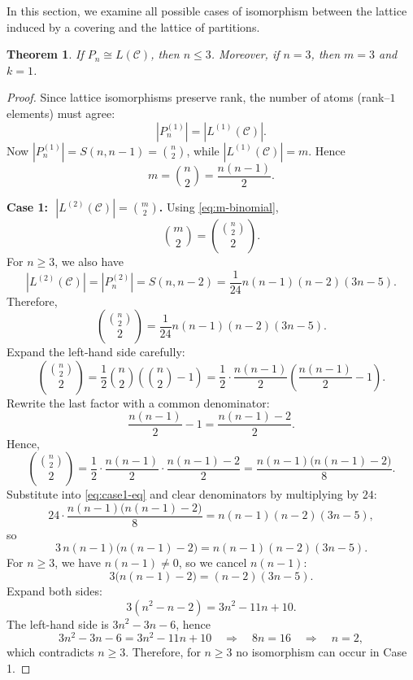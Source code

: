 \documentclass{article}
\newtheorem{theorem}{Theorem}[section]
\begin{document}
In this section, we examine all possible cases of isomorphism between the lattice induced by a covering and the lattice of partitions.

\begin{theorem}\label{thm:Pn-necessary}
If \(P_n \cong L(\mathcal C)\), then \(n\le 3\).
Moreover, if \(n=3\), then \(m=3\) and \(k=1\).
\end{theorem}

\begin{proof}
Since lattice isomorphisms preserve rank, the number of atoms (rank--\(1\) elements) must agree:
\[
|P_n^{(1)}| = |L^{(1)}(\mathcal C)|.
\]
Now \(|P_n^{(1)}| = S(n,n-1)=\binom{n}{2}\), while \(|L^{(1)}(\mathcal C)|=m\). Hence
\begin{equation}\label{eq:m-binomial}
m=\binom{n}{2}=\frac{n(n-1)}{2}.
\end{equation}

\medskip
\noindent\textbf{Case 1: \(\;|L^{(2)}(\mathcal C)|=\binom{m}{2}\).}
Using \eqref{eq:m-binomial},
\[
\binom{m}{2}=\binom{\binom{n}{2}}{2}.
\]
For \(n\ge 3\), we also have
\[
|L^{(2)}(\mathcal C)|=|P_n^{(2)}|=S(n,n-2)=\frac{1}{24}n(n-1)(n-2)(3n-5).
\]
Therefore,
\begin{equation}\label{eq:case1-eq}
\binom{\binom{n}{2}}{2}=\frac{1}{24}n(n-1)(n-2)(3n-5).
\end{equation}
Expand the left-hand side carefully:
\[
\binom{\binom{n}{2}}{2}
=\frac{1}{2}\binom{n}{2}\!\left(\binom{n}{2}-1\right)
=\frac{1}{2}\cdot \frac{n(n-1)}{2}\left(\frac{n(n-1)}{2}-1\right).
\]
Rewrite the last factor with a common denominator:
\[
\frac{n(n-1)}{2}-1=\frac{n(n-1)-2}{2}.
\]
Hence,
\[
\binom{\binom{n}{2}}{2}
=\frac{1}{2}\cdot \frac{n(n-1)}{2}\cdot \frac{n(n-1)-2}{2}
=\frac{n(n-1)\bigl(n(n-1)-2\bigr)}{8}.
\]
Substitute into \eqref{eq:case1-eq} and clear denominators by multiplying by \(24\):
\[
24\cdot \frac{n(n-1)\bigl(n(n-1)-2\bigr)}{8}
= n(n-1)(n-2)(3n-5),
\]
so
\[
3\,n(n-1)\bigl(n(n-1)-2\bigr)=n(n-1)(n-2)(3n-5).
\]
For \(n\ge 3\), we have \(n(n-1)\neq 0\), so we cancel \(n(n-1)\):
\[
3\bigl(n(n-1)-2\bigr)=(n-2)(3n-5).
\]
Expand both sides:
\[
3(n^2-n-2) = 3n^2-11n+10.
\]
The left-hand side is \(3n^2-3n-6\), hence
\[
3n^2-3n-6 = 3n^2-11n+10
\quad\Longrightarrow\quad
8n=16
\quad\Longrightarrow\quad
n=2,
\]
which contradicts \(n\ge 3\). Therefore, for \(n\ge 3\) no isomorphism can occur in Case 1.


\end{proof}
\end{document}
